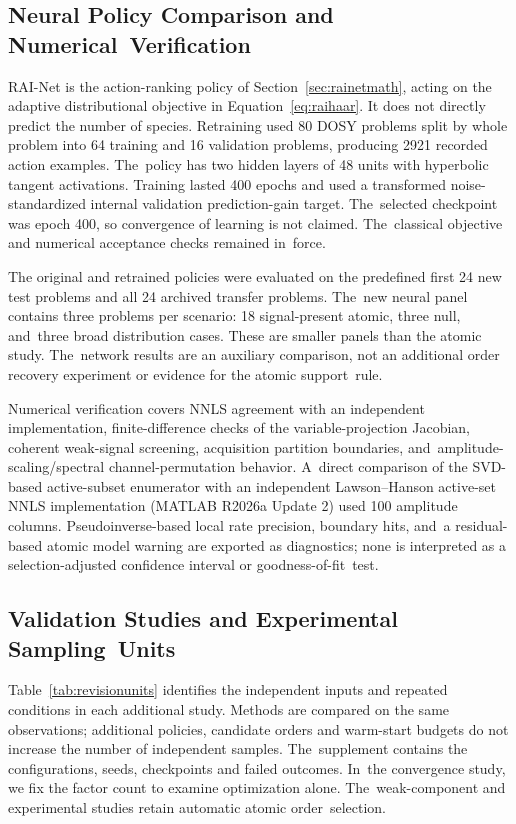 \documentclass[mathematics,article,accept,moreauthors]{Definitions/mdpi}
\begin{document}
\subsection{Neural Policy Comparison and Numerical~Verification}
RAI-Net is the action-ranking policy of Section~\ref{sec:rainetmath}, acting on the adaptive distributional objective in Equation~\eqref{eq:raihaar}. It does not directly predict the number of species. Retraining used 80 DOSY problems split by whole problem into 64 training and 16 validation problems, producing 2921 recorded action examples. The~policy has two hidden layers of 48 units with hyperbolic tangent activations. Training lasted 400 epochs and used a transformed noise-standardized internal validation prediction-gain target. The~selected checkpoint was epoch 400, so convergence of learning is not claimed. The~classical objective and numerical acceptance checks remained in~force.

The original and retrained policies were evaluated on the predefined first 24 new test problems and all 24 archived transfer problems. The~new neural panel contains three problems per scenario: 18 signal-present atomic, three null, and~three broad distribution cases. These are smaller panels than the atomic study. The~network results are an auxiliary comparison, not an additional order recovery experiment or evidence for the atomic support~rule.

Numerical verification covers NNLS agreement with an independent implementation, finite-difference checks of the variable-projection Jacobian, coherent weak-signal screening, acquisition partition boundaries, and~amplitude-scaling/spectral channel-permutation behavior. A~direct comparison of the SVD-based active-subset enumerator with an independent Lawson--Hanson active-set NNLS implementation (MATLAB R2026a Update 2) used 100 amplitude columns. Pseudoinverse-based local rate precision, boundary hits, and~a residual-based atomic model warning are exported as diagnostics; none is interpreted as a selection-adjusted confidence interval or goodness-of-fit~test.


\subsection{Validation Studies and Experimental Sampling~Units}\label{sec:extendeddesign}
Table~\ref{tab:revisionunits} identifies the independent inputs and repeated
conditions in each additional study. Methods are compared on the same observations;
additional policies, candidate orders and warm-start budgets do not increase the
number of independent samples. The~supplement contains the configurations, seeds,
checkpoints and failed outcomes. In~the convergence study, we fix the factor count
to examine optimization alone. The~weak-component and experimental studies retain
automatic atomic order~selection.
\end{document}
